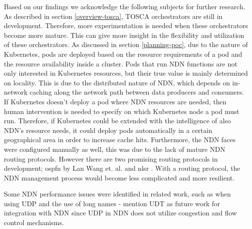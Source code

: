 


Based on our findings we acknowledge the following subjects for further research. As described in section \ref{overview-tosca}, TOSCA orchestrators are still in development. Therefore, more experimentation is needed when these orchestrators become more mature. This can give more insight in the flexibility and utilization of these orchestrators. As discussed in section \ref{planning-poc}, due to the nature of Kubernetes, pods are deployed based on the resource requirements of a pod and the resource availability inside a cluster. Pods that run NDN functions are not only interested in Kubernetes resources, but their true value is mainly determined on locality. This is due to the distributed nature of NDN, which depends on in-network caching along the network path between data producers and consumers. If Kubernetes doesn't deploy a pod where NDN resources are needed, then human intervention is needed to specify on which Kubernetes node a pod must run. Therefore, if Kubernetes could be extended with the intelligence of also NDN's resource needs, it could deploy pods automatically in a certain geographical area in order to increase cache hits. Furthermore, the NDN faces were configured manually as well, this was due to the lack of mature NDN routing protocols. However there are two promising routing protocols in development; \gls{ospfn} by Lan Wang et. al. \cite{ndn-ospfn1, ndn-ospfn2} and \gls{nlsr} \cite{nlsr}. With a routing protocol, the NDN management process would become less complicated and more resilient.

Some NDN performance issues were identified in related work, such as when using UDP and the use of long names - mention UDT as future work for integration with NDN since UDP in NDN does not utilize congestion and flow control mechanisms.

